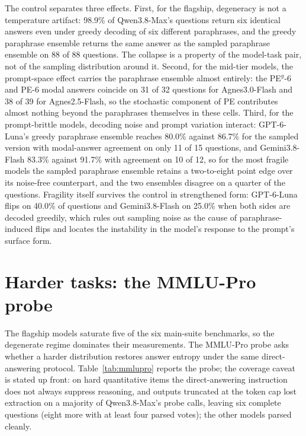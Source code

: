 The control separates three effects. First, for the flagship, degeneracy is not a temperature artifact: 98.9\% of Qwen3.8-Max's questions return six identical answers even under greedy decoding of six different paraphrases, and the greedy paraphrase ensemble returns the same answer as the sampled paraphrase ensemble on 88 of 88 questions. The collapse is a property of the model-task pair, not of the sampling distribution around it. Second, for the mid-tier models, the prompt-space effect carries the paraphrase ensemble almost entirely: the PE$^{g}$-6 and PE-6 modal answers coincide on 31 of 32 questions for Agnes3.0-Flash and 38 of 39 for Agnes2.5-Flash, so the stochastic component of PE contributes almost nothing beyond the paraphrases themselves in these cells. Third, for the prompt-brittle models, decoding noise and prompt variation interact: GPT-6-Luna's greedy paraphrase ensemble reaches 80.0\% against 86.7\% for the sampled version with modal-answer agreement on only 11 of 15 questions, and Gemini3.8-Flash 83.3\% against 91.7\% with agreement on 10 of 12, so for the most fragile models the sampled paraphrase ensemble retains a two-to-eight point edge over its noise-free counterpart, and the two ensembles disagree on a quarter of the questions. Fragility itself survives the control in strengthened form: GPT-6-Luna flips on 40.0\% of questions and Gemini3.8-Flash on 25.0\% when both sides are decoded greedily, which rules out sampling noise as the cause of paraphrase-induced flips and locates the instability in the model's response to the prompt's surface form.

\section{Harder tasks: the MMLU-Pro probe}
\setcounter{table}{0}
\label{app:mmlupro}
\label{sec:mmlupro}

The flagship models saturate five of the six main-suite benchmarks, so the degenerate regime dominates their measurements. The MMLU-Pro probe asks whether a harder distribution restores answer entropy under the same direct-answering protocol. Table~\ref{tab:mmlupro} reports the probe; the coverage caveat is stated up front: on hard quantitative items the direct-answering instruction does not always suppress reasoning, and outputs truncated at the token cap lost extraction on a majority of Qwen3.8-Max's probe calls, leaving six complete questions (eight more with at least four parsed votes); the other models parsed cleanly.

